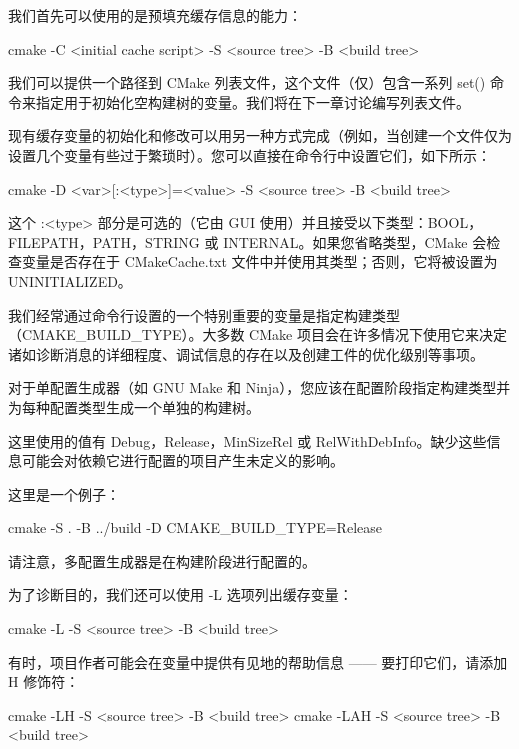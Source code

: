 我们首先可以使用的是预填充缓存信息的能力：

\begin{shell}
cmake -C <initial cache script> -S <source tree> -B <build tree>
\end{shell}

我们可以提供一个路径到 CMake 列表文件，这个文件（仅）包含一系列 set() 命令来指定用于初始化空构建树的变量。我们将在下一章讨论编写列表文件。

现有缓存变量的初始化和修改可以用另一种方式完成（例如，当创建一个文件仅为设置几个变量有些过于繁琐时）。您可以直接在命令行中设置它们，如下所示：

\begin{shell}
cmake -D <var>[:<type>]=<value> -S <source tree> -B <build tree>
\end{shell}

这个 :<type> 部分是可选的（它由 GUI 使用）并且接受以下类型：BOOL，FILEPATH，PATH，STRING 或 INTERNAL。如果您省略类型，CMake 会检查变量是否存在于 CMakeCache.txt 文件中并使用其类型；否则，它将被设置为 UNINITIALIZED。

我们经常通过命令行设置的一个特别重要的变量是指定构建类型（CMAKE\_BUILD\_TYPE）。大多数 CMake 项目会在许多情况下使用它来决定诸如诊断消息的详细程度、调试信息的存在以及创建工件的优化级别等事项。

对于单配置生成器（如 GNU Make 和 Ninja），您应该在配置阶段指定构建类型并为每种配置类型生成一个单独的构建树。

这里使用的值有 Debug，Release，MinSizeRel 或 RelWithDebInfo。缺少这些信息可能会对依赖它进行配置的项目产生未定义的影响。

这里是一个例子：

\begin{shell}
cmake -S . -B ../build -D CMAKE_BUILD_TYPE=Release
\end{shell}

请注意，多配置生成器是在构建阶段进行配置的。

为了诊断目的，我们还可以使用 -L 选项列出缓存变量：

\begin{shell}
cmake -L -S <source tree> -B <build tree>
\end{shell}

有时，项目作者可能会在变量中提供有见地的帮助信息 —— 要打印它们，请添加 H 修饰符：

\begin{shell}
cmake -LH -S <source tree> -B <build tree>
cmake -LAH -S <source tree> -B <build tree>
\end{shell}

